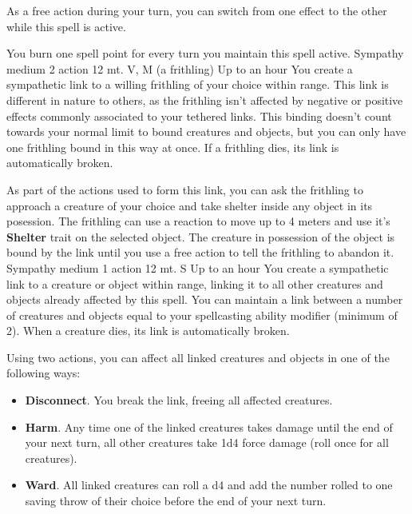     As a free action during your turn, you can switch from one effect to the other while this spell is active.

    You burn one spell point for every turn you maintain this spell active.
    {Sympathy medium}
    {2 action}
    {12 mt.}
    {V, M (a frithling)}
    {Up to an hour}
    You create a sympathetic link to a willing frithling of your choice within range.
    This link is different in nature to others, as the frithling isn't affected by negative or positive effects commonly associated to your tethered links.
    This binding doesn't count towards your normal limit to bound creatures and objects, but you can only have one frithling bound in this way at once.
    If a frithling dies, its link is automatically broken.

    As part of the actions used to form this link, you can ask the frithling to approach a creature of your choice and take shelter inside any object in its posession.
    The frithling can use a reaction to move up to 4 meters and use it's \textbf{Shelter} trait on the selected object.
    The creature in possession of the object is bound by the link until you use a free action to tell the frithling to abandon it.
    {Sympathy medium}
    {1 action}
    {12 mt.}
    {S}
    {Up to an hour}
    You create a sympathetic link to a creature or object within range, linking it to all other creatures and objects already affected by this spell.
    You can maintain a link between a number of creatures and objects equal to your spellcasting ability modifier (minimum of 2).
    When a creature dies, its link is automatically broken.

    Using two actions, you can affect all linked creatures and objects in one of the following ways:
    \begin{itemize}
        \item \textbf{Disconnect}.
        You break the link, freeing all affected creatures.
        \item \textbf{Harm}.
        Any time one of the linked creatures takes damage until the end of your next turn, all other creatures take 1d4 force damage (roll once for all creatures).
        \item \textbf{Ward}.
        All linked creatures can roll a d4 and add the number rolled to one saving throw of their choice before the end of your next turn.
    \end{itemize}

\newpage
